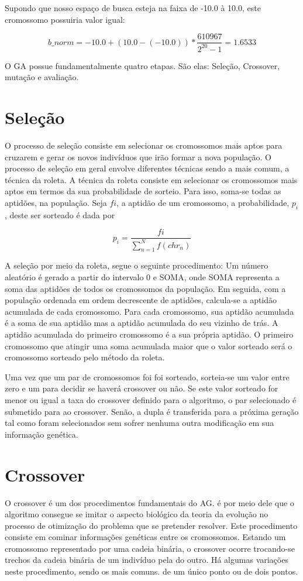 \documentclass[
    12pt,               %
    oneside,%
    a4paper,            %
    english,            %
    french,             %
    spanish,            %
    brazil,             %
    ]{abntex2}
\begin{document}
  Supondo que nosso espaço de busca esteja na faixa de -10.0 à 10.0, este cromossomo possuiria valor igual:

  $$b\_norm = -10.0 + (10.0 - (-10.0))* \frac{610967}{2^{20}-1} = 1.6533 $$


  O GA possue fundamentalmente quatro etapas. São elas: Seleção, Crossover, mutação e avaliação.

\section{Seleção}
  O processo de seleção consiste em selecionar os cromossomos mais aptos para cruzarem e gerar os novos indivíduos que irão formar a nova população. O processo de seleção em geral envolve diferentes técnicas sendo a mais comum, a técnica da roleta.  A técnica da roleta consiste em selecionar os cromossomos mais aptos em termos da sua probabilidade de sorteio. Para isso, soma-se todas as aptidões, na população. Seja $fi$, a aptidão de um cromossomo, a probabilidade, 
  $p_i$, deste ser sorteado é dada por 

  $$p_i = \frac{fi}{\sum\limits_{n=1}^N f(chr_n)}$$


  A seleção por meio da roleta, segue o seguinte procedimento: Um número aleatório é gerado a partir do intervalo 0 e SOMA, onde SOMA representa a soma das aptidões de todos os cromossomos da população. Em seguida, com a população ordenada em ordem decrescente de aptidões, calcula-se a aptidão acumulada de cada cromossomo. Para cada cromossomo, sua aptidão acumulada é a soma de sua aptidão mas a aptidão acumulada do seu vizinho de trás. A aptidão acumulada do  primeiro cromossomo é a sua própria aptidão. O primeiro cromossomo que atingir uma soma acumulada maior que o valor sorteado será o cromossomo sorteado pelo método da roleta. 

  Uma vez que um par de cromossomos foi foi sorteado, sorteia-se um valor entre zero e um para decidir se haverá crossover ou não. Se este valor sorteado for menor ou igual a taxa do crossover definido para o algoritmo, o par selecionado é submetido para ao crossover. Senão, a dupla é transferida para a próxima geração tal como foram selecionados sem sofrer nenhuma outra modificação em sua informação genética.

\section{Crossover}
  
  O crossover é um dos procedimentos fundamentais do AG. é por meio dele que o algoritmo consegue se imitar o aspecto biológico da teoria da evolução no processo de otimização do problema que se pretender resolver. Este procedimento consiste em cominar informações genéticas entre os cromossomos. Estando um cromossomo representado por uma cadeia binária, o crossover ocorre trocando-se trechos da cadeia binária de um indivíduo pela do outro. Há algumas variações neste procedimento, sendo os mais comuns. de um único ponto ou de dois pontos.
\end{document}
